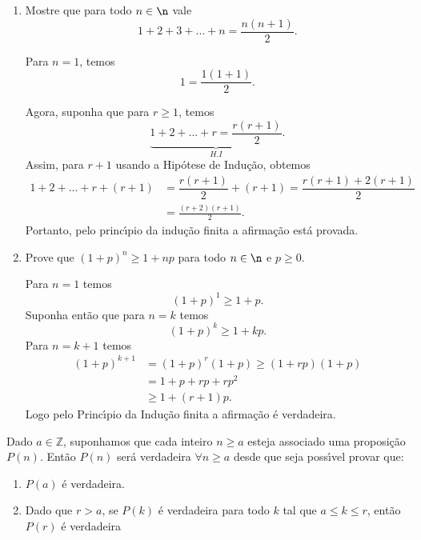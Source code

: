 \begin{exemplos}
	\begin{enumerate}
		\item Mostre que para todo $n \in \n$ vale
		\[
			1+2+3+...+n = \frac{n(n+1)}{2}.
		\]
		\begin{solucao}
			Para $n=1$, temos
			\[
				1=\displaystyle\frac{1(1+1)}{2}.
			\]

			Agora, suponha que para $r\geq 1$, temos
			\[
				\underbrace{1+2+...+r = \frac{r(r+1)}{2}}_{H.I}.
			\]
			Assim, para $r+1$ usando a Hip{\'o}tese de Indu{\c c}{\~a}o, obtemos
			\begin{align*}
				1+2+...+r+(r+1) &= \dfrac{r(r+1)}{2}+(r+1) = \dfrac{r(r+1)+2(r+1)}{2}\\ 
				&= \frac{(r+2)(r+1)}{2}.
			\end{align*}
			Portanto, pelo princ{\'\i}pio da indu{\c c}{\~a}o finita a afirma\c{c}\~ao est\'a provada.
		\end{solucao}

		\item Prove que $(1 + p)^n \ge 1 + np$ para todo $n \in \n$ e $p \ge 0$.
		\begin{solucao}
			Para $n = 1$ temos
			\[
				(1 + p)^1 \ge 1 + p.
			\]
			Suponha ent\~ao que para $n = k$ temos
			\[
				(1 + p)^k \ge 1 + kp.
			\]
			Para $n = k + 1$ temos
			\begin{align*}
				(1 + p)^{k + 1} &= (1 + p)^r(1 + p) \ge (1 + rp)(1 + p) \\ &= 1 + p + rp + rp^2 \\ &\ge 1 + (r + 1)p.
			\end{align*}
			Logo pelo Princ{\'\i}pio da Indu\c{c}\~ao finita a afirma\c{c}\~ao \'e verdadeira.
		\end{solucao}
	\end{enumerate}
\end{exemplos}




\begin{teorema}
Dado $a\in\mathbb{Z}$, suponhamos que cada inteiro $n\geq a$ esteja associado uma proposi{\c c}{\~a}o $P(n)$. Ent{\~a}o $P(n)$ ser{\'a} verdadeira $\forall n\geq a$ desde que seja poss{\'\i}vel provar que:
\begin{enumerate}
\item $P(a)$ {\'e} verdadeira.
\item Dado que $r > a$, se $P(k)$ {\'e} verdadeira para todo $k$ tal que $a \leq k \leq r$, ent{\~a}o $P(r)$ {\'e} verdadeira
\end{enumerate}
\end{teorema}


